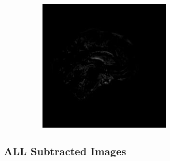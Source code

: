 \documentclass[12pt, fleqn, titlepage]{article}
\newcommand\skipperer{0.45pt}
\begin{document}
\begin{figure}[H]
\begin{subfigure}[b]{0.8\textwidth}
		\hskip\skipperer
		\includegraphics[width=0.22\linewidth]{imgs/subtracted_images/yz/136_S_0196_yz_1.5_1.5gen_comparison}
	\end{subfigure}
	\caption{}
	\label{}
\end{figure}

\subsection{ALL Subtracted Images}\label{all_subtracted_images}
\end{document}
